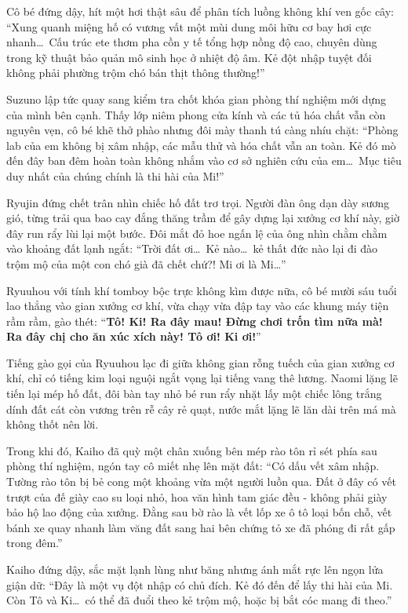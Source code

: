 \documentclass[../main.tex]{subfiles}
\begin{document}
Cô bé đứng dậy, hít một hơi thật sâu để phân tích luồng không khí ven gốc cây: ``Xung quanh miệng hố có vương vất một mùi dung môi hữu cơ bay hơi cực nhanh\dots\ Cấu trúc ete thơm pha cồn y tế tổng hợp nồng độ cao, chuyên dùng trong kỹ thuật bảo quản mô sinh học ở nhiệt độ âm. Kẻ đột nhập tuyệt đối không phải phường trộm chó bán thịt thông thường!''

Suzuno lập tức quay sang kiểm tra chốt khóa gian phòng thí nghiệm mới dựng của mình bên cạnh. Thấy lớp niêm phong cửa kính và các tủ hóa chất vẫn còn nguyên vẹn, cô bé khẽ thở phào nhưng đôi mày thanh tú càng nhíu chặt: ``Phòng lab của em không bị xâm nhập, các mẫu thử và hóa chất vẫn an toàn. Kẻ đó mò đến đây ban đêm hoàn toàn không nhắm vào cơ sở nghiên cứu của em\dots\ Mục tiêu duy nhất của chúng chính là thi hài của Mi!''

Ryujin đứng chết trân nhìn chiếc hố đất trơ trọi. Người đàn ông dạn dày sương gió, từng trải qua bao cay đắng thăng trầm để gây dựng lại xưởng cơ khí này, giờ đây run rẩy lùi lại một bước. Đôi mắt đỏ hoe ngấn lệ của ông nhìn chằm chằm vào khoảng đất lạnh ngắt: ``Trời đất ơi\dots\ Kẻ nào\dots\ kẻ thất đức nào lại đi đào trộm mộ của một con chó già đã chết chứ?! Mi ơi là Mi\dots''

Ryuuhou với tính khí tomboy bộc trực không kìm được nữa, cô bé mười sáu tuổi lao thẳng vào gian xưởng cơ khí, vừa chạy vừa đập tay vào các khung máy tiện rầm rầm, gào thét: ``\textbf{Tô! Ki! Ra đây mau! Đừng chơi trốn tìm nữa mà! Ra đây chị cho ăn xúc xích này! Tô ơi! Ki ơi!}''

Tiếng gào gọi của Ryuuhou lạc đi giữa không gian rỗng tuếch của gian xưởng cơ khí, chỉ có tiếng kim loại nguội ngắt vọng lại tiếng vang thê lương. Naomi lặng lẽ tiến lại mép hố đất, đôi bàn tay nhỏ bé run rẩy nhặt lấy một chiếc lông trắng dính đất cát còn vương trên rễ cây rẻ quạt, nước mắt lặng lẽ lăn dài trên má mà không thốt nên lời.

Trong khi đó, Kaiho đã quỳ một chân xuống bên mép rào tôn rỉ sét phía sau phòng thí nghiệm, ngón tay cô miết nhẹ lên mặt đất: ``Có dấu vết xâm nhập. Tường rào tôn bị bẻ cong một khoảng vừa một người luồn qua. Đất ở đây có vết trượt của đế giày cao su loại nhỏ, hoa văn hình tam giác đều - không phải giày bảo hộ lao động của xưởng. Đằng sau bờ rào là vết lốp xe ô tô loại bốn chỗ, vết bánh xe quay nhanh làm văng đất sang hai bên chứng tỏ xe đã phóng đi rất gấp trong đêm.''

Kaiho đứng dậy, sắc mặt lạnh lùng như băng nhưng ánh mắt rực lên ngọn lửa giận dữ: ``Đây là một vụ đột nhập có chủ đích. Kẻ đó đến để lấy thi hài của Mi. Còn Tô và Ki\dots\ có thể đã đuổi theo kẻ trộm mộ, hoặc bị bắt cóc mang đi theo.''
\end{document}
